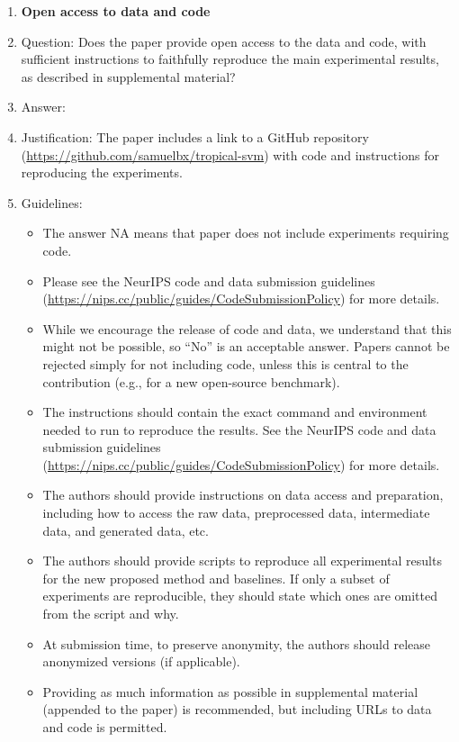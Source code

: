 \documentclass{article}
\begin{document}
\begin{enumerate}
\item {\bf Open access to data and code}
    \item[] Question: Does the paper provide open access to the data and code, with sufficient instructions to faithfully reproduce the main experimental results, as described in supplemental material?
    \item[] Answer: \answerYes{}
    \item[] Justification: The paper includes a link to a GitHub repository (\url{https://github.com/samuelbx/tropical-svm}) with code and instructions for reproducing the experiments.
    \item[] Guidelines:
    \begin{itemize}
        \item The answer NA means that paper does not include experiments requiring code.
        \item Please see the NeurIPS code and data submission guidelines (\url{https://nips.cc/public/guides/CodeSubmissionPolicy}) for more details.
        \item While we encourage the release of code and data, we understand that this might not be possible, so “No” is an acceptable answer. Papers cannot be rejected simply for not including code, unless this is central to the contribution (e.g., for a new open-source benchmark).
        \item The instructions should contain the exact command and environment needed to run to reproduce the results. See the NeurIPS code and data submission guidelines (\url{https://nips.cc/public/guides/CodeSubmissionPolicy}) for more details.
        \item The authors should provide instructions on data access and preparation, including how to access the raw data, preprocessed data, intermediate data, and generated data, etc.
        \item The authors should provide scripts to reproduce all experimental results for the new proposed method and baselines. If only a subset of experiments are reproducible, they should state which ones are omitted from the script and why.
        \item At submission time, to preserve anonymity, the authors should release anonymized versions (if applicable).
        \item Providing as much information as possible in supplemental material (appended to the paper) is recommended, but including URLs to data and code is permitted.
    \end{itemize}



\end{enumerate}
\end{document}
